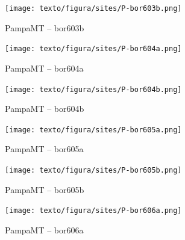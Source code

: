 \begin{figure}[H]
        \caption{PampaMT -- bor603b}
            \begin{center}
                \texttt{[image: texto/figura/sites/P-bor603b.png]}
            \end{center}
    \end{figure}
    \begin{figure}[H]
        \caption{PampaMT -- bor604a}
            \begin{center}
                \texttt{[image: texto/figura/sites/P-bor604a.png]}
            \end{center}
    \end{figure}
    
    \begin{figure}[H]
        \caption{PampaMT -- bor604b}
            \begin{center}
                \texttt{[image: texto/figura/sites/P-bor604b.png]}
            \end{center}
    \end{figure}
    
    \begin{figure}[H]
        \caption{PampaMT -- bor605a}
            \begin{center}
                \texttt{[image: texto/figura/sites/P-bor605a.png]}
            \end{center}
    \end{figure}
    
    \begin{figure}[H]
        \caption{PampaMT -- bor605b}
            \begin{center}
                \texttt{[image: texto/figura/sites/P-bor605b.png]}
            \end{center}
    \end{figure}
    
    \begin{figure}[H]
        \caption{PampaMT -- bor606a}
            \begin{center}
                \texttt{[image: texto/figura/sites/P-bor606a.png]}
            \end{center}
    \end{figure}
    
